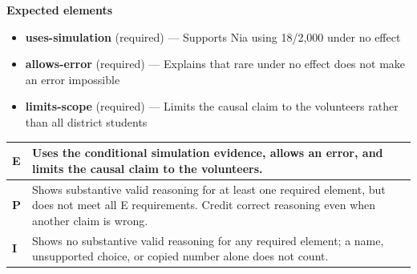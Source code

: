 \documentclass[11pt]{article}
\begin{document}

\textbf{Expected elements}
\begin{itemize}[leftmargin=1.5em,itemsep=2pt,topsep=2pt]
  \item \textbf{uses-simulation} (required) --- Supports Nia using 18/2,000 under no effect
  \item \textbf{allows-error} (required) --- Explains that rare under no effect does not make an error impossible
  \item \textbf{limits-scope} (required) --- Limits the causal claim to the volunteers rather than all district students
\end{itemize}

{\small\renewcommand{\arraystretch}{1.25}
\noindent\begin{tabular}{|p{0.5in}|p{5.9in}|}
\hline
\textbf{E} & Uses the conditional simulation evidence, allows an error, and limits the causal claim to the volunteers. \\ \hline
\textbf{P} & Shows substantive valid reasoning for at least one required element, but does not meet all E requirements. Credit correct reasoning even when another claim is wrong. \\ \hline
\textbf{I} & Shows no substantive valid reasoning for any required element; a name, unsupported choice, or copied number alone does not count. \\ \hline
\end{tabular}}

\clearpage
{}
\end{document}
